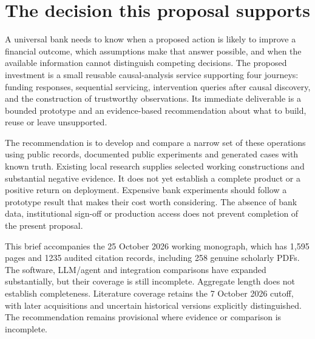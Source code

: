 \hypertarget{the-decision-this-proposal-supports}{%
\section{The decision this proposal
supports}\label{the-decision-this-proposal-supports}}

A universal bank needs to know when a proposed action is likely to
improve a financial outcome, which assumptions make that answer
possible, and when the available information cannot distinguish
competing decisions. The proposed investment is a small reusable
causal-analysis service supporting four journeys: funding responses,
sequential servicing, intervention queries after causal discovery, and
the construction of trustworthy observations. Its immediate deliverable
is a bounded prototype and an evidence-based recommendation about what
to build, reuse or leave unsupported.

The recommendation is to develop and compare a narrow set of these
operations using public records, documented public experiments and
generated cases with known truth. Existing local research supplies
selected working constructions and substantial negative evidence. It
does not yet establish a complete product or a positive return on
deployment. Expensive bank experiments should follow a prototype result
that makes their cost worth considering. The absence of bank data,
institutional sign-off or production access does not prevent completion
of the present proposal. \citep{sp13_scope}

This brief accompanies the 25 October 2026 working monograph, which has
1,595 pages and 1235 audited citation records, including 258 genuine
scholarly PDFs. The software, LLM/agent and integration comparisons have
expanded substantially, but their coverage is still incomplete.
Aggregate length does not establish completeness. Literature coverage
retains the 7 October 2026 cutoff, with later acquisitions and uncertain
historical versions explicitly distinguished. The recommendation remains
provisional where evidence or comparison is incomplete.
\citep{sp23nt_reader,sp23lt_reader,sp23dw_reader,sp23sm_reader,sp22wf_reader,sp22ft_reader,sp22si_reader,sp22ob_reader,sp22dk_reader,sp22iv_reader,sp22bs_reader,sp21rr_reader,sp21pr_reader,sp21gs_reader,sp21eo_reader,sp21tr_reader,sp21ae_reader,sp21gr_reader,sp21ck_reader,sp21cx_reader,sp20md_reader,sp20gf_reader,sp20hy_reader,sp20je_reader,sp20nc_reader,sp20gc_reader,sp20ea_reader,sp20vm_reader,sp20pye_reader,sp20fx_reader,sp20pa_reader,sp20rfx_reader}

